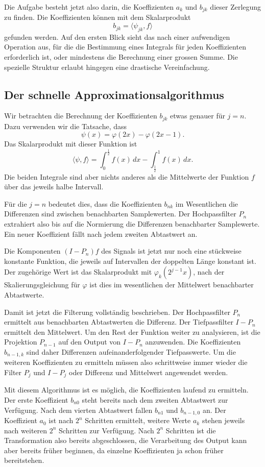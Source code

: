 Die Aufgabe besteht jetzt also darin, die Koeffizienten $a_k$ und
$b_{jk}$ dieser Zerlegung zu finden.
Die Koeffizienten können mit dem Skalarprodukt
\[
b_{jk} = \langle \psi_{jk}, f\rangle
\]
gefunden werden.
Auf den ersten Blick sieht das nach einer aufwendigen Operation
aus, für die die Bestimmung eines Integrals für jeden Koeffizienten
erforderlich ist, oder mindestens die Berechnung einer grossen Summe.
Die spezielle Struktur erlaubt hingegen eine drastische Vereinfachung.


\subsection{Der schnelle Approximationsalgorithmus}
Wir betrachten die Berechnung der Koeffizienten $b_{jk}$ etwas genauer für
$j=n$.
Dazu verwenden wir die Tatsache, dass 
\[
\psi(x) = \varphi(2x) - \varphi(2x-1).
\]
Das Skalarprodukt mit dieser Funktion ist
\[
\langle \psi,f\rangle
=
\int_0^{\frac12} f(x)\,dx - \int_{\frac12}^1 f(x)\,dx.
\]
Die beiden Integrale sind aber nichts anderes als die Mittelwerte
der Funktion $f$ über das jeweils halbe Intervall.

Für die $j=n$ bedeutet dies, dass die Koeffizienten $b_{nk}$ im Wesentlichen
die Differenzen sind zwischen benachbarten Samplewerten.
Der Hochpassfilter $P_n$ extrahiert also bis auf die Normierung
die Differenzen benachbarter Samplewerte.
Ein neuer Koeffizient fällt nach jedem zweiten Abtastwert an.

Die Komponenten $(I-P_n)f$ des Signals ist jetzt nur noch eine stückweise
konstante Funktion, die jeweils auf Intervallen der doppelten Länge konstant
ist.
Der zugehörige Wert ist das Skalarprodukt mit $\varphi_k(2^{j-1}x)$, nach
der Skalierungsgleichung für $\varphi$ ist dies im wesentlichen der
Mittelwert benachbarter Abtastwerte.

Damit ist jetzt die Filterung vollständig beschrieben.
Der Hochpassfilter $P_n$ ermittelt aus benachbarten Abtastwerten die
Differenz.
Der Tiefpassfilter $I-P_n$ ermittelt den Mittelwert.
Um den Rest der Funktion weiter zu analysieren, ist die Projektion $P_{n-1}$
auf den Output von $I-P_n$ anzuwenden.
Die Koeffizienten $b_{n-1,k}$ sind daher Differenzen aufeinanderfolgender
Tiefpasswerte.
Um die weiteren Koeffizienten zu ermitteln müssen also schrittweise
immer wieder die Filter $P_j$ und $I-P_j$ oder Differenz und Mittelwert
angewendet werden.

Mit diesem Algorithmus ist es möglich, die Koeffizienten laufend zu ermitteln.
Der erste Koeffizient $b_{n0}$ steht bereits nach dem zweiten Abtastwert zur
Verfügung.
Nach dem vierten Abtastwert fallen $b_{n1}$ und $b_{n-1,0}$ an.
Der Koeffizient $a_0$ ist nach $2^n$ Schritten ermittelt, weitere
Werte $a_k$ stehen jeweils nach weiteren $2^n$ Schritten zur Verfügung.
Nach $2^n$ Schritten ist die Transformation also bereits abgeschlossen,
die Verarbeitung des Output kann aber bereits früher beginnen, da einzelne
Koeffizienten ja schon früher bereitstehen.

